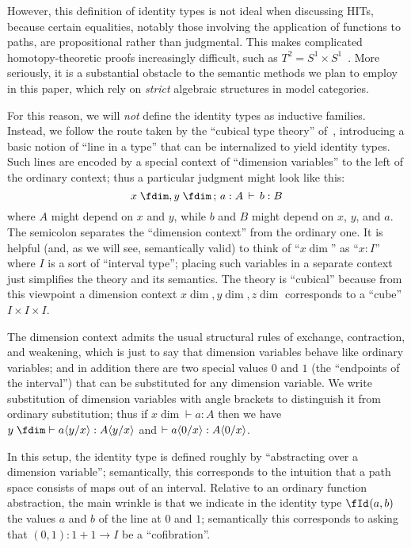 \documentclass{amsart}
\begin{document}
However, this definition of identity types is not ideal when discussing HITs, because certain equalities, notably those involving the application of functions to paths, are propositional rather than judgmental.
This makes complicated homotopy-theoretic proofs increasingly difficult, such as $T^2 = S^1\times S^1$~\cite{lb:torus}.
More seriously, it is a substantial obstacle to the semantic methods we plan to employ in this paper, which rely on \emph{strict} algebraic structures in model categories.

For this reason, we will \emph{not} define the identity types as inductive families.
Instead, we follow the route taken by the ``cubical type theory'' of~\cite{lb:cubical-tt}, introducing a basic notion of ``line in a type'' that can be internalized to yield identity types.
Such lines are encoded by a special context of ``dimension variables'' to the left of the ordinary context; thus a particular judgment might look like this:
\[ x\dim, y\dim \cb a:A \pr b:B \]
where $A$ might depend on $x$ and $y$, while $b$ and $B$ might depend on $x$, $y$, and $a$.
The semicolon separates the ``dimension context'' from the ordinary one.
It is helpful (and, as we will see, semantically valid) to think of ``$x\dim$'' as ``$x:I$'' where $I$ is a sort of ``interval type'';
placing such variables in a separate context just simplifies the theory and its semantics.
The theory is ``cubical'' because from this viewpoint a dimension context $x\dim, y\dim, z\dim$ corresponds to a ``cube'' $I\times I\times I$.

The dimension context admits the usual structural rules of exchange, contraction, and weakening, which is just to say that dimension variables behave like ordinary variables; and in addition there are two special values $0$ and $1$ (the ``endpoints of the interval'') that can be substituted for any dimension variable.
We write substitution of dimension variables with angle brackets to distinguish it from ordinary substitution; thus if $x\dim \vdash a:A$ then we have $y\dim \vdash a\dsubst{y}{x} : A\dsubst{y}{x}$ and $\vdash a\langle 0/x\rangle : A\langle 0/x\rangle$.

In this setup, the identity type is defined roughly by ``abstracting over a dimension variable'';
semantically, this corresponds to the intuition that a path space consists of maps out of an interval.
Relative to an ordinary function abstraction, the main wrinkle is that we indicate in the identity type $\id{a}{b}$ the values $a$ and $b$ of the line at $0$ and $1$; semantically this corresponds to asking that $(0,1):1+1 \to I$ be a ``cofibration''.
\end{document}
